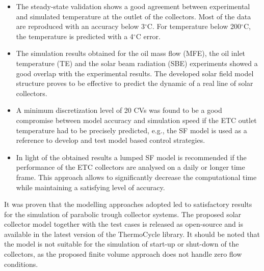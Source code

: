 \documentclass[final,3p,times,review]{elsarticle}
\begin{document}
\begin{itemize}
\item The steady-state validation shows a good agreement between experimental and simulated temperature at the outlet of the collectors. Most of the data are reproduced with an accuracy below 3$^{\circ}$C. For temperature below 200$^{\circ}$C, the temperature is predicted with a  4$^{\circ}$C error.
\item The simulation results obtained for the oil mass flow   (MFE), the oil inlet temperature   (TE) and the solar  beam radiation (SBE) experiments showed a good overlap with the experimental results. The developed solar field model structure proves to be effective to predict the dynamic of a real line of solar collectors.
%
%
\item A minimum discretization level of 20 CVs was found to be a good compromise between model accuracy and simulation speed if the ETC outlet temperature had to be precisely predicted, e.g., the  SF model is used as a reference to develop and test model based control strategies.
%
\item In light of the obtained results a lumped SF model is recommended if the performance of the ETC collectors are analysed on a daily or longer time frame. This approach allows to significantly decrease the computational time while maintaining a satisfying level of accuracy.
\end{itemize}
%
It was proven that the modelling approaches adopted led to satisfactory results for the simulation of parabolic trough collector systems. The proposed solar collector model together with the test cases is released as open-source and is available in the latest version of the ThermoCycle library. It should be noted that the model is not suitable for the simulation of start-up or shut-down of the collectors, as the proposed finite volume approach does not handle zero flow conditions.
%
%
%
\end{document}
